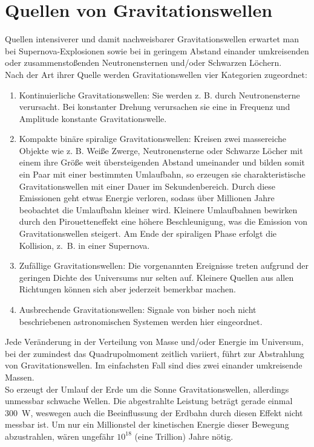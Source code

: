 
\chapter{Quellen von Gravitationswellen}
\label{chapter-konzept}

Quellen intensiverer und damit nachweisbarer Gravitationswellen erwartet man bei Supernova-Explosionen sowie bei in geringem Abstand einander umkreisenden oder zusammenstoßenden Neutronensternen und/oder Schwarzen Löchern. \\ 

Nach der Art ihrer Quelle werden Gravitationswellen vier Kategorien zugeordnet:
\begin{enumerate}
	\item Kontinuierliche Gravitationswellen: Sie werden z. B. durch Neutronensterne verursacht. Bei konstanter Drehung verursachen sie eine in Frequenz und Amplitude konstante Gravitationswelle.
	\item Kompakte binäre spiralige Gravitationswellen: Kreisen zwei massereiche Objekte wie z. B. Weiße Zwerge, Neutronensterne oder Schwarze Löcher mit einem ihre Größe weit übersteigenden Abstand umeinander und bilden somit ein Paar mit einer bestimmten Umlaufbahn, so erzeugen sie charakteristische Gravitationswellen mit einer Dauer im Sekundenbereich. Durch diese Emissionen geht etwas Energie verloren, sodass über Millionen Jahre beobachtet die Umlaufbahn kleiner wird. Kleinere Umlaufbahnen bewirken durch den Pirouetteneffekt eine höhere Beschleunigung, was die Emission von Gravitationswellen steigert. Am Ende der spiraligen Phase erfolgt die Kollision, z. B. in einer Supernova.
	\item 
	Zufällige Gravitationswellen: Die vorgenannten Ereignisse treten aufgrund der geringen Dichte des Universums nur selten auf. Kleinere Quellen aus allen Richtungen können sich aber jederzeit bemerkbar machen.
	\item Ausbrechende Gravitationswellen: Signale von bisher noch nicht beschriebenen astronomischen Systemen werden hier eingeordnet.
	
\end{enumerate}
Jede Veränderung in der Verteilung von Masse und/oder Energie im Universum, bei der zumindest das Quadrupolmoment zeitlich variiert, führt zur Abstrahlung von Gravitationswellen. Im einfachsten Fall sind dies zwei einander umkreisende Massen. \\ 
So erzeugt der Umlauf der Erde um die Sonne Gravitationswellen, allerdings unmessbar schwache Wellen. Die abgestrahlte Leistung beträgt gerade einmal 300 W, weswegen auch die Beeinflussung der Erdbahn durch diesen Effekt nicht messbar ist. Um nur ein Millionstel der kinetischen Energie dieser Bewegung abzustrahlen, wären ungefähr $10^{18}$ (eine Trillion) Jahre nötig.
